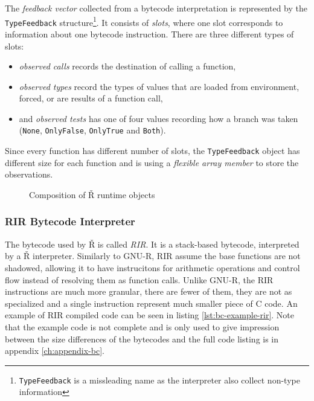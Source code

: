 The \textit{feedback vector} collected from a bytecode interpretation is represented by the \texttt{TypeFeedback} structure\footnote{\texttt{TypeFeedback} is a missleading name as the interpreter also collect non-type information}. It consists of \textit{slots}, where one slot corresponds to information about one bytecode instruction. There are three different types of slots:
\begin{itemize}
  \item{} \textit{observed calls} records the destination of calling a function,
  \item{} \textit{observed types} record the types of values that are loaded from environment, forced, or are results of a function call,
  \item{} and \textit{observed tests} has one of four values recording how a branch was taken (\texttt{None}, \texttt{OnlyFalse}, \texttt{OnlyTrue} and \texttt{Both}).
\end{itemize}
Since every function has different number of slots, the \texttt{TypeFeedback} object has different size for each function and is using a \textit{flexible array member}\cite{flexible-array} to store the observations.

\begin{figure}
	\centering
	\caption{Composition of Ř runtime objects}\label{fig:rsh-composition}
\end{figure}

\subsubsection*{RIR Bytecode Interpreter}

The bytecode used by Ř is called \textit{RIR}. It is a stack-based bytecode, interpreted by a Ř interpreter. Similarly to GNU-R, RIR assume the base functions are not shadowed, allowing it to have instrucitons for arithmetic operations and control flow instead of resolving them as function calls. Unlike GNU-R, the RIR instructions are much more granular, there are fewer of them, they are not as specialized and a single instruction represent much smaller piece of C code. An example of RIR compiled code can be seen in listing \ref{lst:bc-example-rir}. Note that the example code is not complete and is only used to give impression between the size differences of the bytecodes and the full code listing is in appendix \ref{ch:appendix-bc}.

